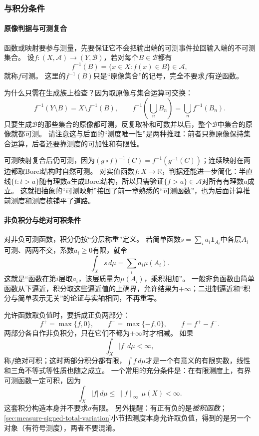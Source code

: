 \subsubsection{与积分条件}

\paragraph{原像判据与可测复合}

函数或映射要参与测量，先要保证它不会把输出端的可测事件拉回输入端的不可测集合。
设$f:(X,\mathcal A)\to(Y,\mathcal B)$，若对每个$B\in\mathcal B$都有
\[
 f^{-1}(B)=\{x\in X:f(x)\in B\}\in\mathcal A,
\]
就称$f$可测。
这里的$f^{-1}(B)$只是“原像集合”的记号，完全不要求$f$有逆函数。

为什么只需在生成族上检查？因为取原像与集合运算可交换：
\[
 f^{-1}(Y\setminus B)=X\setminus f^{-1}(B),\qquad
 f^{-1}\!\left(\bigcup_nB_n\right)=\bigcup_nf^{-1}(B_n).
\]
只要生成$\mathcal B$的那些集合的原像都可测，反复取补和可数并以后，整个$\mathcal B$中集合的原像就都可测。
请注意这与后面的“测度唯一性”是两种推理：前者只靠原像保持集合运算，后者还要靠测度的可加性和有限性。

可测映射复合后仍可测，因为$(g\circ f)^{-1}(C)=f^{-1}(g^{-1}(C))$；连续映射在两边都取Borel结构时自然可测。
对实值函数$f:X\to\mathbb R$，判据还能进一步简化：半直线$\{t:t>a\}$随有理数$a$生成Borel结构，所以只需验证$\{f>a\}\in\mathcal A$对所有有理数$a$成立。
这就把抽象的“可测映射”接回了前一章熟悉的“可测函数”，也为后面计算推前测度和测度核铺平了道路。

\paragraph{非负积分与绝对可积条件}

对非负可测函数，积分仍按“分层称重”定义。
若简单函数$s=\sum_i a_i\mathbf 1_{A_i}$中各层$A_i$可测、两两不交，系数$a_i\geq0$有限，就令
\[
 \int_X s\,d\mu=\sum_i a_i\mu(A_i).
\]
这就是“函数在第$i$层取$a_i$，该层质量为$\mu(A_i)$，乘积相加”。
一般非负函数由简单函数从下逼近，积分取这些逼近值的上确界，允许结果为$+\infty$；二进制逼近和“积分与简单表示无关”的论证与实轴相同，不再重写。

允许函数取负值时，要拆成正负两部分：
\[
 f^+=\max\{f,0\},\qquad f^-=\max\{-f,0\},\qquad f=f^+-f^-.
\]
两部分各自作非负积分，只在它们不都为$+\infty$时才相减。
如果
\[
 \int_X|f|\,d\mu<\infty,
\]
称$f$绝对可积；这时两部分积分都有限，$\int f\,d\mu$才是一个有意义的有限实数，线性和三角不等式等性质也随之成立。
一个常用的充分条件是：在有限测度上，有界可测函数一定可积，因为
\[
 \int_X|f|\,d\mu\leq\|f\|_\infty\,\mu(X)<\infty.
\]
这套积分构造本身并不要求$\sigma$有限。
另外提醒：有正有负的是\emph{被积函数}；\ref{sec:measure-signed-total-variation}小节把测度本身允许取负值，得到的是另一个对象（有符号测度），两者不要混淆。

